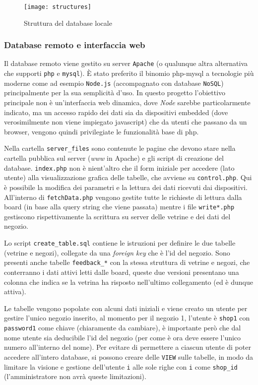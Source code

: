 \begin{figure}[ht]
	\texttt{[image: structures]}
  \caption{Struttura del database locale}
\end{figure}

\subsubsection{Database remoto e interfaccia web}

Il database remoto viene gestito su server \texttt{Apache} (o qualunque altra alternativa che supporti \texttt{php} e \texttt{mysql}). \`E stato preferito il binomio php-mysql a tecnologie pi\`u moderne come ad esempio \texttt{Node.js} (accompagnato con database \texttt{NoSQL}) principalmente per la sua semplicit\`a d'uso. In questo progetto l'obiettivo principale non \`e un'interfaccia web dinamica, dove \textit{Node} sarebbe particolarmente indicato, ma un accesso rapido dei dati sia da dispositivi embedded (dove verosimilmente non viene impiegato javascript) che da utenti che passano da un browser, vengono quindi privilegiate le funzionalit\`a base di php.

Nella cartella \texttt{server\_files} sono contenute le pagine che devono stare nella cartella pubblica sul server (\textit{www} in Apache) e gli script di creazione del database. \texttt{index.php} non \`e nient'altro che il form iniziale per accedere (lato utente) alla visualizzazione grafica delle tabelle, che avviene su \texttt{control.php}. Qui \`e possibile la modifica dei parametri e la lettura dei dati ricevuti dai dispositivi. All'interno di \texttt{fetchData.php} vengono gestite tutte le richieste di lettura dalla board (in base alla query string che viene passata) mentre i file \texttt{write*.php} gestiscono rispettivamente la scrittura su server delle vetrine e dei dati del negozio.

Lo script \texttt{create\_table.sql} contiene le istruzioni per definire le due tabelle (vetrine e negozi), collegate da una \textit{foreign key} che \`e l'id del negozio. Sono presenti anche tabelle \texttt{feedback\_*} con la stessa struttura di vetrine e negozi, che conterranno i dati attivi letti dalle board, queste due versioni presentano una colonna che indica se la vetrina ha risposto nell'ultimo collegamento (ed \`e dunque attiva).

Le tabelle vengono popolate con alcuni dati iniziali e viene creato un utente per gestire l'unico negozio inserito, al momento per il negozio 1, l'utente \`e \texttt{shop1} con \texttt{password1} come chiave (chiaramente da cambiare), \`e importante per\`o che dal nome utente sia deducibile l'id del negozio (per come \`e ora deve essere l'unico numero all'interno del nome). Per evitare di permettere a ciascun utente di poter accedere all'intero database, si possono creare delle \texttt{VIEW} sulle tabelle, in modo da limitare la visione e gestione dell'utente \texttt{i} alle sole righe con \texttt{i} come \texttt{shop\_id} (l'amministratore non avr\`a queste limitazioni).

